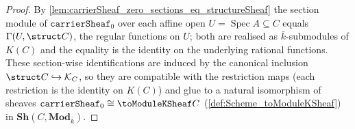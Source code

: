 \begin{proof}
  By \cref{lem:carrierSheaf_zero_sections_eq_structureSheaf} the section module
  of \(\texttt{carrierSheaf}_0\) over each affine open
  \(U = \operatorname{Spec} A \subseteq C\) equals \(\Gamma(U, \struct C)\), the
  regular functions on \(U\); both are realised as \(\bar k\)-submodules of
  \(K(C)\) and the equality is the identity on the underlying rational
  functions. These section-wise identifications are induced by the canonical
  inclusion \(\struct C \hookrightarrow \mathcal K_C\), so they are compatible
  with the restriction maps (each restriction is the identity on \(K(C)\)) and
  glue to a natural isomorphism of sheaves
  \(\texttt{carrierSheaf}_0 \cong \toModuleKSheaf C\)
  (\cref{def:Scheme_toModuleKSheaf}) in
  \(\mathbf{Sh}(C, \mathbf{Mod}_{\bar k})\).
\end{proof}

